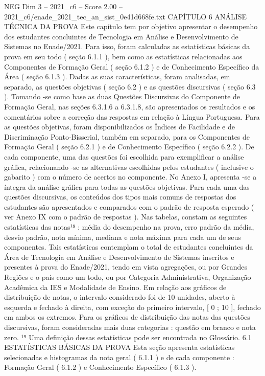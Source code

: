 \begin{textsample}{NEG Dim 3 – 2021\_c6 – Score 2.00 – 2021\_c6/enade\_2021\_tec\_an\_sist\_0e41d668fe.txt}  \label{ex:f3_neg_239}
CAPÍTULO 6 ANÁLISE TÉCNICA DA PROVA Este capítulo tem por objetivo apresentar o desempenho dos estudantes concluintes de Tecnologia em Análise e Desenvolvimento de Sistemas no Enade/2021.
Para isso, foram calculadas as estatísticas básicas da prova em seu todo ( seção 6.1.1 ), bem como as estatísticas relacionadas aos Componentes de Formação Geral ( seção 6.1.2 ) e de Conhecimento Específico da Área ( seção 6.1.3 ).
Dadas as suas características, foram analisadas, em separado, as questões objetivas ( seção 6.2 ) e as questões discursivas ( seção 6.3 ).
Tomando -se como base as duas Questões Discursivas do Componente de Formação Geral, nas seções 6.3.1.6 a 6.3.1.8, são apresentados os resultados e os comentários sobre a correção das respostas em relação à Língua Portuguesa.
Para as questões objetivas, foram disponibilizados os Índices de Facilidade e de Discriminação Ponto-Bisserial, também em separado, para os Componentes de Formação Geral ( seção 6.2.1 ) e de Conhecimento Específico ( seção 6.2.2 ).
De cada componente, uma das questões foi escolhida para exemplificar a análise gráfica, relacionando -se as alternativas escolhidas pelos estudantes ( inclusive o gabarito ) com o número de acertos no componente.
No Anexo I, apresenta -se a íntegra da análise gráfica para todas as questões objetivas.
Para cada uma das questões discursivas, os conteúdos dos tipos mais comuns de respostas dos estudantes são apresentados e comparados com o padrão de resposta esperado ( ver Anexo IX com o padrão de respostas ).
Nas tabelas, constam as seguintes estatísticas das notas¹⁹ : média do desempenho na prova, erro padrão da média, desvio padrão, nota mínima, mediana e nota máxima para cada um de seus componentes.
Tais estatísticas contemplam o total de estudantes concluintes da Área de Tecnologia em Análise e Desenvolvimento de Sistemas inscritos e presentes à prova do Enade/2021, tendo em vista agregações, ou por Grandes Regiões e o país como um todo, ou por Categoria Administrativa, Organização Acadêmica da IES e Modalidade de Ensino.
Em relação aos gráficos de distribuição de notas, o intervalo considerado foi de 10 unidades, aberto à esquerda e fechado à direita, com exceção do primeiro intervalo, [ 0 ; 10 ], fechado em ambos os extremos.
Para os gráficos de distribuição das notas das questões discursivas, foram consideradas mais duas categorias : questão em branco e nota zero. ¹⁹ Uma definição dessas estatísticas pode ser encontrada no Glossário. 6.1 ESTATÍSTICAS BÁSICAS DA PROVA Esta seção apresenta estatísticas selecionadas e histogramas da nota geral ( 6.1.1 ) e de cada componente : Formação Geral ( 6.1.2 ) e Conhecimento Específico ( 6.1.3 ).

\end{textsample}

